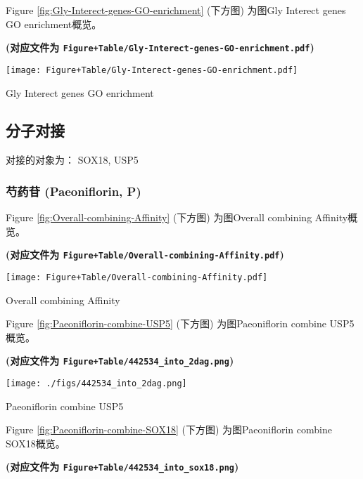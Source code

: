 \documentclass[
]{article}
\begin{document}
Figure \ref{fig:Gly-Interect-genes-GO-enrichment} (下方图) 为图Gly Interect genes GO enrichment概览。

\textbf{(对应文件为 \texttt{Figure+Table/Gly-Interect-genes-GO-enrichment.pdf})}

\def\@captype{figure}
\begin{center}
\texttt{[image: Figure+Table/Gly-Interect-genes-GO-enrichment.pdf]}
\caption{Gly Interect genes GO enrichment}\label{fig:Gly-Interect-genes-GO-enrichment}
\end{center}

\hypertarget{ux5206ux5b50ux5bf9ux63a5}{%
\subsection{分子对接}\label{ux5206ux5b50ux5bf9ux63a5}}

对接的对象为： SOX18, USP5

\hypertarget{ux828dux836fux82f7-paeoniflorin-p}{%
\subsubsection{芍药苷 (Paeoniflorin, P)}\label{ux828dux836fux82f7-paeoniflorin-p}}

Figure \ref{fig:Overall-combining-Affinity} (下方图) 为图Overall combining Affinity概览。

\textbf{(对应文件为 \texttt{Figure+Table/Overall-combining-Affinity.pdf})}

\def\@captype{figure}
\begin{center}
\texttt{[image: Figure+Table/Overall-combining-Affinity.pdf]}
\caption{Overall combining Affinity}\label{fig:Overall-combining-Affinity}
\end{center}

Figure \ref{fig:Paeoniflorin-combine-USP5} (下方图) 为图Paeoniflorin combine USP5概览。

\textbf{(对应文件为 \texttt{Figure+Table/442534\_into\_2dag.png})}

\def\@captype{figure}
\begin{center}
\texttt{[image: ./figs/442534\_into\_2dag.png]}
\caption{Paeoniflorin combine USP5}\label{fig:Paeoniflorin-combine-USP5}
\end{center}

Figure \ref{fig:Paeoniflorin-combine-SOX18} (下方图) 为图Paeoniflorin combine SOX18概览。

\textbf{(对应文件为 \texttt{Figure+Table/442534\_into\_sox18.png})}
\end{document}
